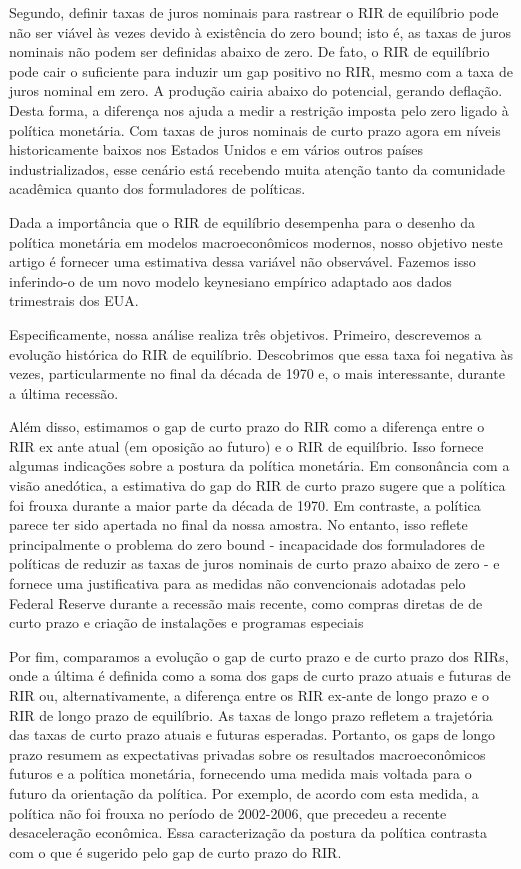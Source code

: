 \documentclass[11pt,oneside,a4paper]{article}
\begin{document}
Segundo, definir taxas de juros nominais para rastrear o RIR de equilíbrio pode não ser viável às vezes devido à existência do zero bound; isto é, as taxas de juros nominais não podem ser definidas abaixo de zero. De fato, o RIR de equilíbrio pode cair o suficiente para induzir um gap positivo no RIR, mesmo com a taxa de juros nominal em zero. A produção cairia abaixo do potencial, gerando deflação. Desta forma, a diferença nos ajuda a medir a restrição imposta pelo zero ligado à política monetária. Com taxas de juros nominais de curto prazo agora em níveis historicamente baixos nos Estados Unidos e em vários outros países industrializados, esse cenário está recebendo muita atenção tanto da comunidade acadêmica quanto dos formuladores de políticas.

Dada a importância que o RIR de equilíbrio desempenha para o desenho da política monetária em modelos macroeconômicos modernos, nosso objetivo neste artigo é fornecer uma estimativa dessa variável não observável. Fazemos isso inferindo-o de um novo modelo keynesiano empírico adaptado aos dados trimestrais dos EUA. 

Especificamente, nossa análise realiza três objetivos. Primeiro, descrevemos a evolução histórica do RIR de equilíbrio. Descobrimos que essa taxa foi negativa às vezes, particularmente no final da década de 1970 e, o mais interessante, durante a última recessão.

Além disso, estimamos o gap de curto prazo do RIR como a diferença entre o RIR ex ante atual (em oposição ao futuro) e o RIR de equilíbrio. Isso fornece algumas indicações sobre a postura da política monetária. Em consonância com a visão anedótica, a estimativa do gap do RIR de curto prazo sugere que a política foi frouxa durante a maior parte da década de 1970. Em contraste, a política parece ter sido apertada no final da nossa amostra. No entanto, isso reflete principalmente o problema do zero bound - incapacidade dos formuladores de políticas de reduzir as taxas de juros nominais de curto prazo abaixo de zero - e fornece uma justificativa para as medidas não convencionais adotadas pelo Federal Reserve durante a recessão mais recente, como compras diretas de de curto prazo e criação de instalações e programas especiais

Por fim, comparamos a evolução o gap de curto prazo e de curto prazo dos RIRs, onde a última é definida como a soma dos gaps de curto prazo atuais e futuras de RIR ou, alternativamente, a diferença entre os RIR ex-ante de longo prazo e o RIR de longo prazo de equilíbrio. As taxas de longo prazo refletem a trajetória das taxas de curto prazo atuais e futuras esperadas. Portanto, os gaps de longo prazo resumem as expectativas privadas sobre os resultados macroeconômicos futuros e a política monetária, fornecendo uma medida mais voltada para o futuro da orientação da política. Por exemplo, de acordo com esta medida, a política não foi frouxa no período de 2002-2006, que precedeu a recente desaceleração econômica. Essa caracterização da postura da política contrasta com o que é sugerido pelo gap de curto prazo do RIR.
\end{document}
